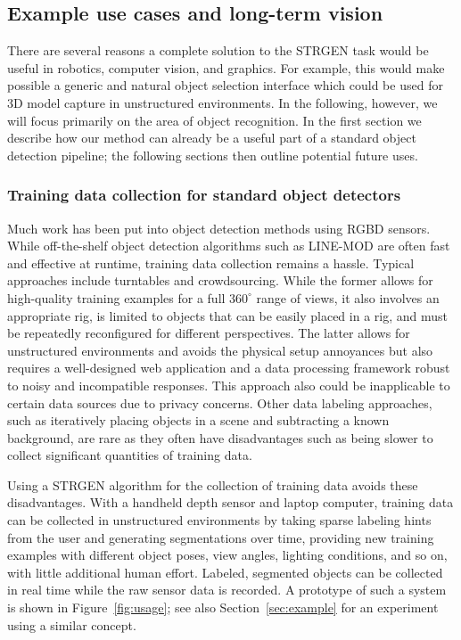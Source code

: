 \documentclass[journal]{IEEEtran}
\begin{document}
\subsection{Example use cases and long-term vision}
\label{sec:examples}

There are several reasons a complete solution to the STRGEN task would be useful in robotics, computer vision, and graphics.  For example, this would make possible a generic and natural object selection interface which could be used for 3D model capture in unstructured environments.  In the following, however, we will focus primarily on the area of object recognition. In the first section we describe how our method can already be a useful part of a standard object detection pipeline; the following sections then outline potential future uses.

\subsubsection{Training data collection for standard object detectors}
\label{sec:trainingintro}

Much work has been put into object detection methods using RGBD sensors.  While off-the-shelf object detection algorithms such as LINE-MOD \cite{hinterstoisser2011a} are often fast and effective at runtime, training data collection remains a hassle.  Typical approaches include turntables and crowdsourcing.  While the former allows for high-quality training examples for a full $360^{\circ}$ range of views, it also involves an appropriate rig, is limited to objects that can be easily placed in a rig, and must be repeatedly reconfigured for different perspectives.  The latter allows for unstructured environments and avoids the physical setup annoyances but also requires a well-designed web application and a data processing framework robust to noisy and incompatible responses. This approach also could be inapplicable to certain data sources due to privacy concerns.  Other data labeling approaches, such as iteratively placing objects in a scene and subtracting a known background, are rare as they often have disadvantages such as being slower to collect significant quantities of training data.

Using a STRGEN algorithm for the collection of training data avoids these disadvantages. With a handheld depth sensor and laptop computer, training data can be collected in unstructured environments by taking sparse labeling hints from the user and generating segmentations over time, providing new training examples with different object poses, view angles, lighting conditions, and so on, with little additional human effort.  Labeled, segmented objects can be collected in real time while the raw sensor data is recorded.  A prototype of such a system is shown in Figure~\ref{fig:usage}; see also Section~\ref{sec:example} for an experiment using a similar concept.
\end{document}
